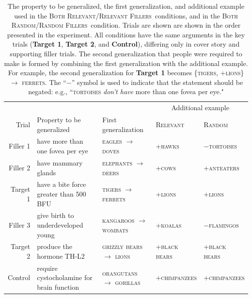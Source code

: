 \documentclass[doc,12pt]{apa}
\newcommand{\category}[1]{\textsc{#1}}
\newcommand{\relevant}{\textsc{Both Relevant}}
\newcommand{\relevantdata}{\textsc{Relevant Fillers}}
\newcommand{\randomdata}{\textsc{Random Fillers}}
\newcommand{\random}{\textsc{Both Random}}
\newcommand{\oneargument}[2]{{#1} $\rightarrow$ {#2}}
\newcommand{\twoargument}[3]{\{{#1}, {#2}\} $\rightarrow$ {#3}}
\newcommand{\stimtableentry}[6]{{#1} & {#2} &
          \oneargument{\category{#3}}{\category{#4}} & \category{#5} &
          \category{#6} \\ }
\begin{document}
\begin{table}[t]
\hspace{-5mm}
\scriptsize
\begin{tabular}{rllll}
\toprule
 & & & \multicolumn{2}{c}{Additional example} \\
\cmidrule{4-5}
 Trial & Property to be generalized & First generalization & \textsc{Relevant} & \textsc{Random} \\
\midrule
\stimtableentry{Filler 1}{have more than one fovea per eye}{eagles}{doves}{+hawks}{$-$tortoises}
\stimtableentry{Filler 2}{have mammary glands}{elephants}{deers}{+cows}{+anteaters}
\stimtableentry{Target 1}{have a bite force greater than 500 BFU}{tigers}{ferrets}{+lions}{+lions}
\stimtableentry{Filler 3}{give birth to underdeveloped
  young}{kangaroos}{wombats}{+koalas}{$-$flamingos}
\stimtableentry{Target 2}{produce the hormone TH-L2}{grizzly
  bears}{lions}{+black bears}{+black bears}
\stimtableentry{Control}{require cystocholamine for brain
  function}{orangutans}{gorillas}{+chimpanzees}{+chimpanzees}
  \bottomrule
\end{tabular}
\vspace{-5mm}
\caption{%
  The property to be generalized, the first generalization, and additional
  example used in the \relevant/\relevantdata\ conditions, and in the \random/\randomdata\ condition. Trials are shown are shown in the order presented in the experiment. All conditions have the same arguments in the key trials ({\bf Target 1}, {\bf Target 2}, and {\bf Control}), differing only in cover story and supporting filler trials. The second generalization that people were required to make is formed by combining the first generalization with the additional example. For example, the second generalization for {\bf Target 1} becomes  \twoargument{\category{tigers}}{\category{+lions}}{\category{ferrets}}.
The ``$-$'' symbol is used to indicate that the statement should be negated: e.g., ``\category{tortoises} {\em don't have} more than one fovea per eye."
}

\label{tbl:stimuli}
\end{table}
\end{document}
